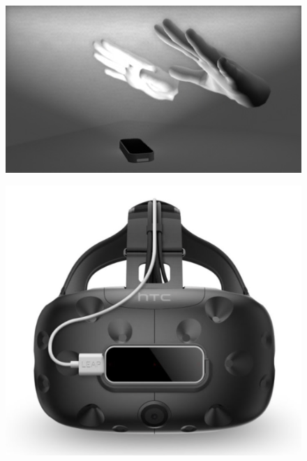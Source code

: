 \begin{table}[!htb]
    \begin{minipage}{\linewidth}
        \centering
        \begin{subfigure}{0.6\textwidth}
            \includegraphics[width=\linewidth]{figures/LeapView.jpg}
            \centering
        \end{subfigure}
        \label{fig:DMD}
    \end{minipage}
    \begin{minipage}{\linewidth}
        \centering
        \begin{subfigure}{0.4\textwidth}
            \centering
            \includegraphics[width=\linewidth]{figures/VRsupport.png}

\end{subfigure}
\end{minipage}
\end{table}
